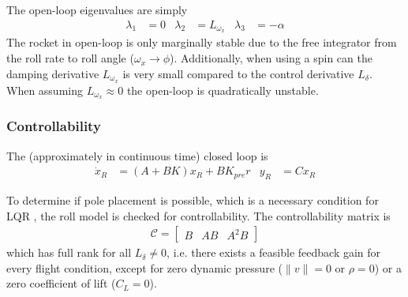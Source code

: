The open-loop eigenvalues are simply
\begin{align}
    \lambda_1 &= 0 & \lambda_2 &= L_{\omega_x} & \lambda_3 &= -\alpha 
\end{align}
The rocket in open-loop is only marginally stable due to the free integrator from the roll rate to roll angle ($\omega_x \to \phi$).
Additionally, when using a spin can the damping derivative $L_{\omega_x}$ is very small compared to the control derivative $L_\delta$. 
When assuming $L_{\omega_x} \approx 0$ the open-loop is quadratically unstable.


\subsubsection{Controllability}
The (approximately in continuous time) closed loop is 
\begin{align}
    \dot x_R &= (A+BK) x_R + B K_{pre} r & y_R &= C x_R
    \label{eq:controller-closedloop}
\end{align}

To determine if pole placement is possible, which is a necessary condition for LQR \cite{werner2021}, the roll model is checked for controllability.
The controllability matrix is 
\begin{align}
    \mathcal{C} = \begin{bmatrix}
        B & AB & A^2 B 
    \end{bmatrix}
\end{align}
which has full rank for all $L_\delta \neq 0$, i.e. there exists a feasible feedback gain for every flight condition, except for zero dynamic pressure ($\lVert v \rVert = 0$ or $\rho = 0$) or a zero coefficient of lift ($C_L = 0$).

